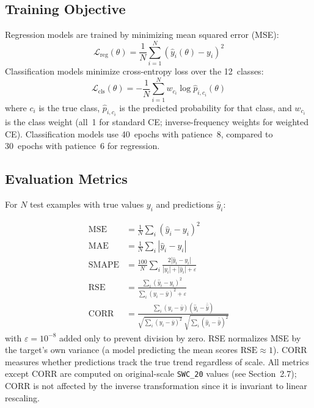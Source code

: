 \documentclass[11pt]{article}
\begin{document}
\subsection{Training Objective}

Regression models are trained by minimizing mean squared error (MSE):
\begin{equation}
    \mathcal{L}_{\text{reg}}(\theta) = \frac{1}{N} \sum_{i=1}^{N}
    \left( \hat{y}_i(\theta) - y_i \right)^2
\end{equation}
Classification models minimize cross-entropy loss over the 12~classes:
\begin{equation}
    \mathcal{L}_{\text{cls}}(\theta) = -\frac{1}{N} \sum_{i=1}^{N}
    w_{c_i} \log \hat{p}_{i,c_i}(\theta)
\end{equation}
where $c_i$ is the true class, $\hat{p}_{i,c_i}$ is the predicted probability for
that class, and $w_{c_i}$ is the class weight (all~1 for standard CE; inverse-frequency
weights for weighted CE). Classification models use 40~epochs with patience~8, compared
to 30~epochs with patience~6 for regression.

\subsection{Evaluation Metrics}

For $N$ test examples with true values $y_i$ and predictions $\hat{y}_i$:

\begin{align}
    \text{MSE} &= \frac{1}{N} \sum_{i} (\hat{y}_i - y_i)^2 \\[4pt]
    \text{MAE} &= \frac{1}{N} \sum_{i} |\hat{y}_i - y_i| \\[4pt]
    \text{SMAPE} &= \frac{100}{N} \sum_{i}
    \frac{2 |\hat{y}_i - y_i|}{|y_i| + |\hat{y}_i| + \varepsilon} \\[4pt]
    \text{RSE} &= \frac{\sum_{i} (\hat{y}_i - y_i)^2}
    {\sum_{i} (y_i - \bar{y})^2 + \varepsilon} \\[4pt]
    \text{CORR} &= \frac{\sum_{i} (y_i - \bar{y})(\hat{y}_i - \bar{\hat{y}})}
    {\sqrt{\sum_{i} (y_i - \bar{y})^2}
    \;\sqrt{\sum_{i} (\hat{y}_i - \bar{\hat{y}})^2}}
\end{align}
with $\varepsilon = 10^{-8}$ added only to prevent division by zero. RSE normalizes
MSE by the target's own variance (a model predicting the mean scores
$\text{RSE} \approx 1$). CORR measures whether predictions track the true trend
regardless of scale. All metrics except CORR are computed on original-scale
\texttt{SWC\_20} values (see Section~2.7); CORR is not affected by the inverse
transformation since it is invariant to linear rescaling.
\end{document}
